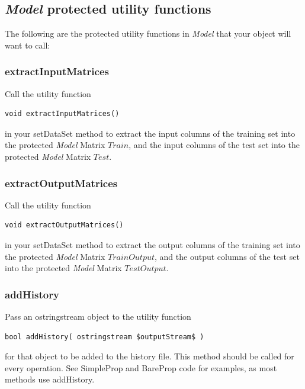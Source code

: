 \documentclass{report}
\begin{document}
\subsection{{\em Model} protected utility functions}

The following are the protected utility functions in {\em Model} that
your object will want to call:

\subsubsection{extractInputMatrices}

Call the utility function

\begin{verbatim}
void extractInputMatrices()
\end{verbatim}

in your setDataSet method to extract the input columns of the training
set into the protected {\em Model} Matrix $Train$, and the input
columns of the test set into the protected {\em Model} Matrix $Test$.

\subsubsection{extractOutputMatrices}

Call the utility function

\begin{verbatim}
void extractOutputMatrices()
\end{verbatim}

in your setDataSet method to extract the output columns of the
training set into the protected {\em Model} Matrix $TrainOutput$, and
the output columns of the test set into the protected {\em Model}
Matrix $TestOutput$.

\subsubsection{addHistory}

Pass an ostringstream object to the utility function

\begin{verbatim}
bool addHistory( ostringstream $outputStream$ )
\end{verbatim}

for that object to be added to the history file.  This method should
be called for every operation.  See SimpleProp and BareProp code for
examples, as most methods use addHistory.
\end{document}
